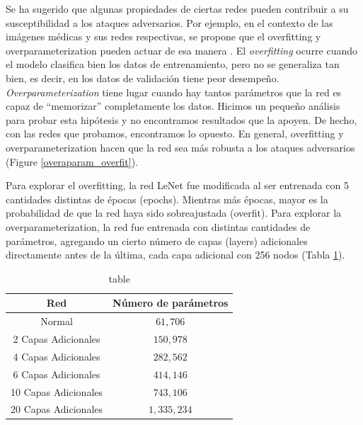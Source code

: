 Se ha sugerido que algunas propiedades de ciertas redes pueden contribuir a su susceptibilidad a los ataques adversarios. Por ejemplo, en el contexto de las imágenes médicas y sus redes respectivas, se propone que el overfitting y overparameterization pueden actuar de esa manera \cite{ma2020understanding}. El \textit{overfitting} ocurre cuando el modelo clasifica bien los datos de entrenamiento, pero no se generaliza tan bien, es decir, en los datos de validación tiene peor desempeño. \textit{Overparameterization} tiene lugar cuando hay tantos parámetros que la red es capaz de ``memorizar'' completamente los datos. Hicimos un pequeño análisis para probar esta hipótesis y no encontramos resultados que la apoyen. De hecho, con las redes que probamos, encontramos lo opuesto. En general, overfitting y overparameterization hacen que la red sea más robusta a los ataques adversarios (Figure \ref{overaparam_overfit}).

Para explorar el overfitting, la red LeNet fue modificada al ser entrenada con 5 cantidades distintas de épocas (epochs). Mientras más épocas, mayor es la probabilidad de que la red haya sido sobreajustada (overfit). Para explorar la overparameterization, la red fue entrenada con distintas cantidades de parámetros, agregando un cierto número de capas (layers) adicionales directamente antes de la última, cada capa adicional con 256 nodos (Tabla \ref{overparam_table}).

\renewcommand{\tablename}{Tabla}
\begin{table}[h]
    \centering
    \begin{tabular}{|c|c|}
     \hline
     Red & Número de parámetros  \\ 
     \hline
     Normal & $61,706$  \\ 
     \hline
     2 Capas Adicionales & $150,978$  \\ 
     \hline
     4 Capas Adicionales & $282,562$  \\ 
     \hline
     6 Capas Adicionales & $414,146$  \\ 
     \hline
     10 Capas Adicionales & $743,106$  \\ 
     \hline
     20 Capas Adicionales & $1,335,234$  \\ 
     \hline
    \end{tabular}
    \caption{table}
    \label{overparam_table}
\end{table}

